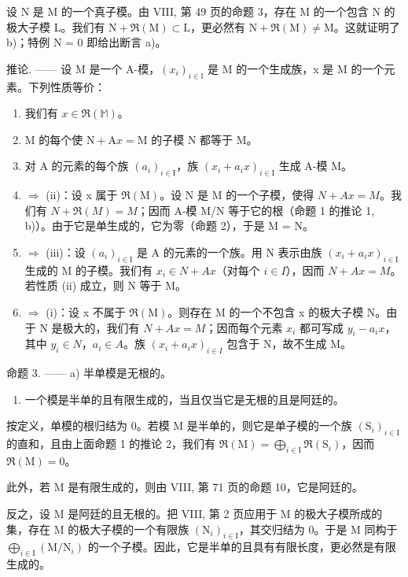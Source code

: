设 N 是 M 的一个真子模。由 VIII, 第 49 页的命题 3，存在 M 的一个包含 N 的极大子模 L。我们有 \(\mathrm{N} + \Re(\mathrm{M}) \subset \mathrm{L}\)，更必然有 \(\mathrm{N} + \Re(\mathrm{M}) \neq \mathrm{M}\)。这就证明了 b)；特例 N = 0 即给出断言 a)。

推论. —— 设 M 是一个 A-模，\((x_{i})_{i\in\mathbb{I}}\) 是 M 的一个生成族，x 是 M 的一个元素。下列性质等价：

\begin{enumerate}
\def\labelenumi{(\roman{enumi})}
\item
  我们有 \(x \in \Re(\mathbb{M})\)。
\item
  M 的每个使 \(\mathrm{N} + \mathrm{A}x = \mathrm{M}\) 的子模 N 都等于 M。
\item
  对 A 的元素的每个族 \((a_{i})_{i\in\mathrm{I}}\)，族 \((x_{i}+a_{i}x)_{i\in\mathrm{I}}\) 生成 A-模 M。
\item
  \(\Rightarrow\) (ii)：设 x 属于 \(\Re(\mathrm{M})\)。设 N 是 M 的一个子模，使得 \(N + Ax = M\)。我们有 \(N + \Re(M) = M\)；因而 A-模 M/N 等于它的根（命题 1 的推论 1, b)）。由于它是单生成的，它为零（命题 2），于是 M = N。
\item
  \(\Rightarrow\) (iii)：设 \((a_{i})_{i\in\mathrm{I}}\) 是 A 的元素的一个族。用 N 表示由族 \((x_{i}+a_{i}x)_{i\in\mathrm{I}}\) 生成的 M 的子模。我们有 \(x_{i}\in N+Ax\)（对每个 \(i\in I\)），因而 \(N+Ax=M\)。若性质 (ii) 成立，则 N 等于 M。
\item
  \(\Rightarrow\) (i)：设 x 不属于 \(\Re(\mathrm{M})\)。则存在 M 的一个不包含 x 的极大子模 N。由于 N 是极大的，我们有 \(N + Ax = M\)；因而每个元素 \(x_{i}\) 都可写成 \(y_{i} - a_{i}x\)，其中 \(y_{i} \in N\)，\(a_{i} \in A\)。族 \((x_{i} + a_{i}x)_{i \in I}\) 包含于 N，故不生成 M。
\end{enumerate}

命题 3. —— a) 半单模是无根的。

\begin{enumerate}
\def\labelenumi{\alph{enumi})}
\setcounter{enumi}{1}
\tightlist
\item
  一个模是半单的且有限生成的，当且仅当它是无根的且是阿廷的。
\end{enumerate}

按定义，单模的根归结为 0。若模 M 是半单的，则它是单子模的一个族 \((\mathrm{S}_{i})_{i\in\mathrm{I}}\) 的直和，且由上面命题 1 的推论 2，我们有 \(\mathfrak{R}(\mathrm{M})=\bigoplus_{i\in\mathrm{I}}\mathfrak{R}(\mathrm{S}_{i})\)，因而 \(\mathfrak{R}(\mathrm{M})=0\)。

此外，若 M 是有限生成的，则由 VIII, 第 71 页的命题 10，它是阿廷的。

反之，设 M 是阿廷的且无根的。把 VIII, 第 2 页应用于 M 的极大子模所成的集，存在 M 的极大子模的一个有限族 \((\mathrm{N}_{i})_{i\in\mathrm{I}}\)，其交归结为 0。于是 M 同构于 \(\bigoplus_{i\in\mathrm{I}}(\mathrm{M}/\mathrm{N}_{i})\) 的一个子模。因此，它是半单的且具有有限长度，更必然是有限生成的。

